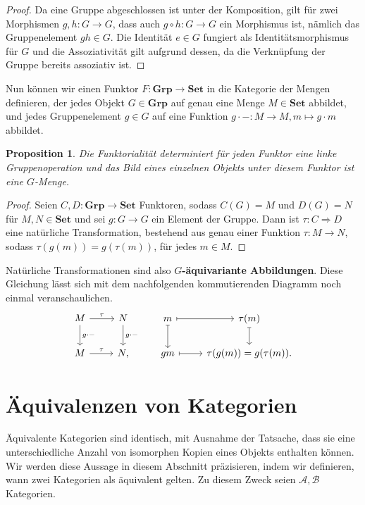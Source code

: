 \documentclass[leqno]{article}
\theoremstyle{plain}
\newtheorem{prop}[thm]{Proposition}
\theoremstyle{definition}
\theoremstyle{remark}
\begin{document}
\begin{proof} Da eine Gruppe abgeschlossen ist unter der Komposition, gilt für zwei Morphismen $g,h: G \rightarrow G$, dass auch $g \circ h: G \rightarrow G$ ein Morphismus ist, nämlich das Gruppenelement $gh \in G$. Die Identität $e \in G$ fungiert als Identitätsmorphismus für $G$ und die Assoziativität gilt aufgrund dessen, da die Verknüpfung der Gruppe bereits assoziativ ist.
\end{proof}

Nun können wir einen Funktor $F: \textbf{Grp} \rightarrow \textbf{Set}$ in die Kategorie der Mengen definieren, der jedes Objekt $G \in \textbf{Grp}$ auf genau eine Menge $M \in \textbf{Set}$ abbildet, und jedes Gruppenelement $g \in G$ auf eine Funktion $g \cdot - : M \rightarrow M, m \mapsto g \cdot m$ abbildet.

\begin{prop}
Die Funktorialität determiniert für jeden Funktor eine linke Gruppenoperation und das Bild eines einzelnen Objekts unter diesem Funktor ist eine $G$-Menge.
\end{prop}

\begin{proof}
Seien $C,D: \textbf{Grp} \rightarrow \textbf{Set}$ Funktoren, sodass $C(G) = M$ und $D(G) = N$ für $M,N \in \textbf{Set}$ und sei $g: G \rightarrow G$ ein Element der Gruppe. Dann ist $\tau: C \Longrightarrow D$ eine natürliche Transformation, bestehend aus genau einer Funktion $\tau: M \rightarrow N$, sodass $\tau(g(m)) = g(\tau(m))$, für jedes $m \in M$.
\end{proof}

Natürliche Transformationen sind also \textbf{$G$-äquivariante Abbildungen}. Diese Gleichung lässt sich mit dem nachfolgenden kommutierenden Diagramm noch einmal veranschaulichen.
	\begin{equation}
		\begin{tikzcd}
		M \arrow[d, "g\cdot-"] \arrow[r, "\tau"] & N \arrow[d, "g\cdot-"] & m \arrow[d, maps to] \arrow[r, maps to] & \tau(m) \arrow[d, maps to] \\
		M \arrow[r, "\tau"]                      & {N,}                   & gm \arrow[r, maps to]                   & \tau(g(m)) = g(\tau(m)).  
		\end{tikzcd}
	\end{equation}

\section{Äquivalenzen von Kategorien}
Äquivalente Kategorien sind identisch, mit Ausnahme der Tatsache, dass sie eine unterschiedliche Anzahl von isomorphen Kopien eines Objekts enthalten können. Wir werden diese Aussage in diesem Abschnitt präzisieren, indem wir definieren, wann zwei Kategorien als äquivalent gelten. Zu diesem Zweck seien $\mathcal{A}, \mathcal{B}$ Kategorien. 
\end{document}
